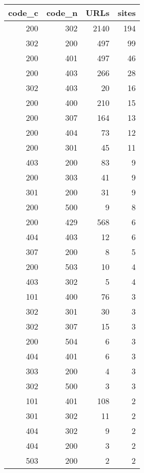 \begin{tabular}{rrrr}
\toprule
 code\_c &  code\_n &  URLs &  sites \\
\midrule
    200 &     302 &  2140 &    194 \\
    302 &     200 &   497 &     99 \\
    200 &     401 &   497 &     46 \\
    200 &     403 &   266 &     28 \\
    302 &     403 &    20 &     16 \\
    200 &     400 &   210 &     15 \\
    200 &     307 &   164 &     13 \\
    200 &     404 &    73 &     12 \\
    200 &     301 &    45 &     11 \\
    403 &     200 &    83 &      9 \\
    200 &     303 &    41 &      9 \\
    301 &     200 &    31 &      9 \\
    200 &     500 &     9 &      8 \\
    200 &     429 &   568 &      6 \\
    404 &     403 &    12 &      6 \\
    307 &     200 &     8 &      5 \\
    200 &     503 &    10 &      4 \\
    403 &     302 &     5 &      4 \\
    101 &     400 &    76 &      3 \\
    302 &     301 &    30 &      3 \\
    302 &     307 &    15 &      3 \\
    200 &     504 &     6 &      3 \\
    404 &     401 &     6 &      3 \\
    303 &     200 &     4 &      3 \\
    302 &     500 &     3 &      3 \\
    101 &     401 &   108 &      2 \\
    301 &     302 &    11 &      2 \\
    404 &     302 &     9 &      2 \\
    404 &     200 &     3 &      2 \\
    503 &     200 &     2 &      2 \\
\bottomrule
\end{tabular}
